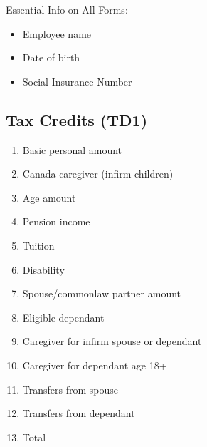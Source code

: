 \documentclass[letterpaper,10pt,english]{sphinxmanual}
\begin{document}
\sphinxAtStartPar
Essential Info on All Forms:
\begin{itemize}
\item {} 
\sphinxAtStartPar
Employee name

\item {} 
\sphinxAtStartPar
Date of birth

\item {} 
\sphinxAtStartPar
Social Insurance Number

\end{itemize}


\subsection{Tax Credits (TD1)}
\label{\detokenize{onboarding_employee:tax-credits-td1}}\begin{enumerate}
%
\item {} 
\sphinxAtStartPar
Basic personal amount

\item {} 
\sphinxAtStartPar
Canada caregiver (infirm children)

\item {} 
\sphinxAtStartPar
Age amount

\item {} 
\sphinxAtStartPar
Pension income

\item {} 
\sphinxAtStartPar
Tuition

\item {} 
\sphinxAtStartPar
Disability

\item {} 
\sphinxAtStartPar
Spouse/common\sphinxhyphen{}law partner amount

\item {} 
\sphinxAtStartPar
Eligible dependant

\item {} 
\sphinxAtStartPar
Caregiver for infirm spouse or dependant

\item {} 
\sphinxAtStartPar
Caregiver for dependant age 18+

\item {} 
\sphinxAtStartPar
Transfers from spouse

\item {} 
\sphinxAtStartPar
Transfers from dependant

\item {} 
\sphinxAtStartPar
Total

\end{enumerate}
\end{document}

